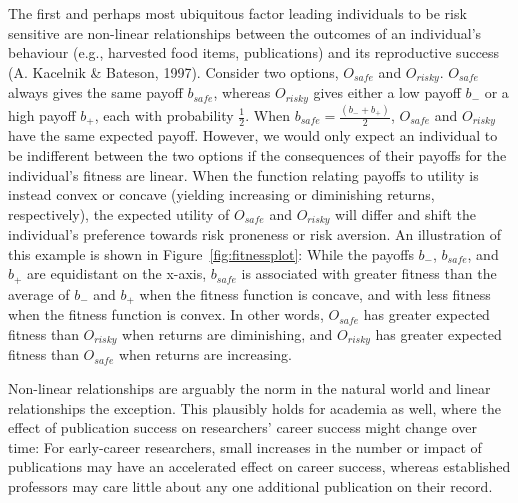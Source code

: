 \documentclass[
  ,man,mask,floatsintext]{apa6}
\begin{document}
The first and perhaps most ubiquitous factor leading individuals to be risk sensitive are non-linear relationships between the outcomes of an individual's behaviour (e.g., harvested food items, publications) and its reproductive success (A. Kacelnik \& Bateson, 1997).
Consider two options, \(O_{safe}\) and \(O_{risky}\).
\(O_{safe}\) always gives the same payoff \(b_{safe}\), whereas \(O_{risky}\) gives either a low payoff \(b_-\) or a high payoff \(b_+\), each with probability \(\frac{1}{2}\).
When \(b_{safe} = \frac{(b_- + b_+)}{2}\), \(O_{safe}\) and \(O_{risky}\) have the same expected payoff.
However, we would only expect an individual to be indifferent between the two options if the consequences of their payoffs for the individual's fitness are linear.
When the function relating payoffs to utility is instead convex or concave (yielding increasing or diminishing returns, respectively), the expected utility of \(O_{safe}\) and \(O_{risky}\) will differ and shift the individual's preference towards risk proneness or risk aversion.
An illustration of this example is shown in Figure~\ref{fig:fitnessplot}:
While the payoffs \(b_-\), \(b_{safe}\), and \(b_+\) are equidistant on the x-axis, \(b_{safe}\) is associated with greater fitness than the average of \(b_-\) and \(b_+\) when the fitness function is concave, and with less fitness when the fitness function is convex.
In other words, \(O_{safe}\) has greater expected fitness than \(O_{risky}\) when returns are diminishing, and \(O_{risky}\) has greater expected fitness than \(O_{safe}\) when returns are increasing.

Non-linear relationships are arguably the norm in the natural world and linear relationships the exception.
This plausibly holds for academia as well, where the effect of publication success on researchers' career success might change over time:
For early-career researchers, small increases in the number or impact of publications may have an accelerated effect on career success, whereas established professors may care little about any one additional publication on their record.
\end{document}
